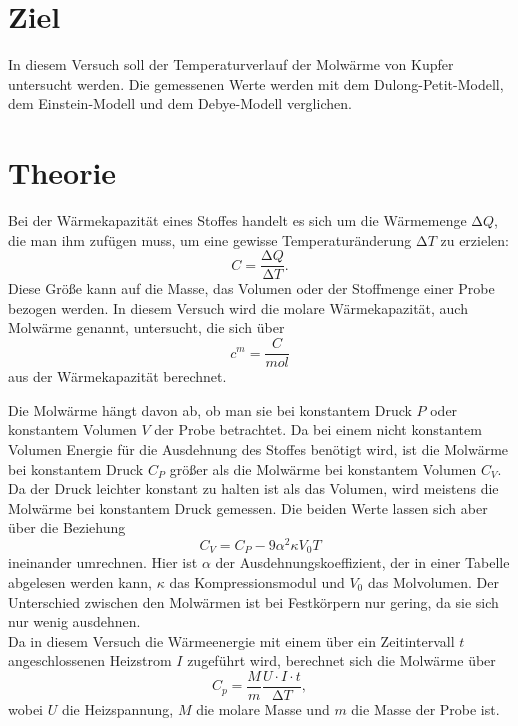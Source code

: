\section{Ziel}
\label{sec:Ziel}
In diesem Versuch soll der Temperaturverlauf der Molwärme von 
Kupfer untersucht werden. Die gemessenen Werte werden mit dem 
Dulong-Petit-Modell, dem Einstein-Modell und dem Debye-Modell 
verglichen.

\section{Theorie}
\label{sec:Theorie}
Bei der Wärmekapazität eines Stoffes handelt es sich um die Wärmemenge $\increment Q$, die 
man ihm zufügen muss, um eine gewisse Temperaturänderung $\increment T$ zu erzielen:
\begin{equation*}
    C = \frac{\increment Q}{\increment T}.
\end{equation*}
Diese Größe kann auf die Masse, das Volumen oder der Stoffmenge einer Probe bezogen werden. 
In diesem Versuch wird die molare Wärmekapazität, auch Molwärme genannt, untersucht, die sich über 
\begin{equation*}
    c^{\si{m}} = \frac{C}{\si{mol}}
\end{equation*}
aus der Wärmekapazität berechnet. 

Die Molwärme hängt davon ab, ob man sie bei konstantem Druck $P$ oder konstantem Volumen $V$ der Probe betrachtet. Da bei einem nicht konstantem Volumen 
Energie für die Ausdehnung des Stoffes benötigt wird, ist die Molwärme bei konstantem Druck $C_{\si{P}}$ größer als die Molwärme bei konstantem Volumen $C_{\si{V}}$. 
Da der Druck leichter konstant zu halten ist als das Volumen, wird meistens die Molwärme bei konstantem Druck gemessen. 
Die beiden Werte lassen sich aber über die Beziehung 
\begin{equation}
    \label{eqn:cv}
    C_{\si{V}}=C_{\si{P}}-9\alpha ^2 \kappa  V_0 T
\end{equation}
ineinander umrechnen. Hier ist $\alpha$ der Ausdehnungskoeffizient, der in einer Tabelle abgelesen werden kann, $\kappa$ das Kompressionsmodul
und $V_0$ das Molvolumen. Der Unterschied zwischen den Molwärmen ist bei Festkörpern nur gering, da sie sich nur wenig ausdehnen.
\\

Da in diesem Versuch die Wärmeenergie mit einem über ein Zeitintervall $t$ angeschlossenen Heizstrom $I$ zugeführt wird, 
berechnet sich die Molwärme über
\begin{equation}
    \label{eqn:cp}
    C_{\si{p}} = \frac{M}{m} \frac{U\cdot I \cdot t}{\increment T},
\end{equation}
wobei $U$ die Heizspannung, $M$ die molare Masse und $m$ die Masse der Probe ist.
\\

